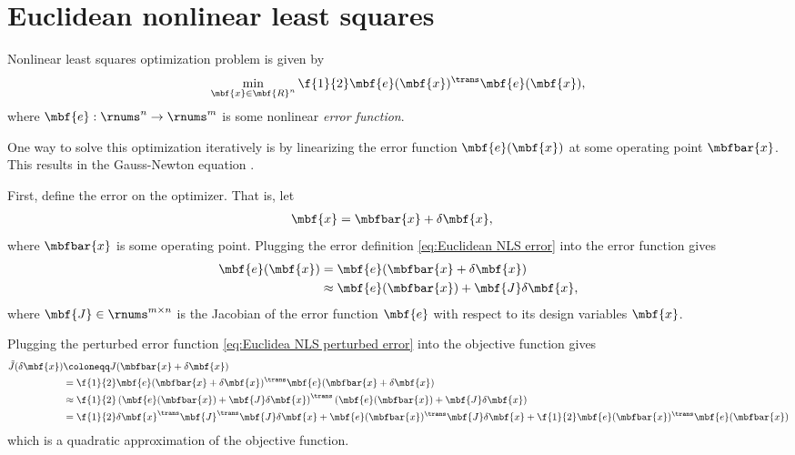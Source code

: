 \documentclass[ nobib, nofonts, notoc]{tufte-handout}
\begin{document}
    \section{Euclidean nonlinear least squares}
    Nonlinear least squares optimization problem is given by
    \begin{align}
        \min_{\mbf{x}\in\mbf{R}^{n}} \f{1}{2}\mbf{e}(\mbf{x})^{\trans}\mbf{e}(\mbf{x}),
    \end{align}
    where $\mbf{e} : \rnums^{n} \to \rnums^{m}$ is some nonlinear \emph{error function}.

    One way to solve this optimization iteratively is by linearizing the error function $\mbf{e}(\mbf{x})$ at some operating point $\mbfbar{x}$. This results in the Gauss-Newton equation \cite{Barfoot_State_2017a,Dellaert_Factor_2017}.

    First, define the error on the optimizer. That is, let
    \begin{align}
        \label{eq:Euclidean NLS error}
        \mbf{x} &= \mbfbar{x} + \delta\mbf{x},
    \end{align}
    where $\mbfbar{x}$ is some operating point. Plugging the error definition \eqref{eq:Euclidean NLS error} into the error function gives
    \begin{align}
        \mbf{e}(\mbf{x}) &= \mbf{e}(\mbfbar{x} +\delta\mbf{x})\\
        \label{eq:Euclidea NLS perturbed error}
        &\approx \mbf{e}(\mbfbar{x}) + \mbf{J}\delta\mbf{x},
    \end{align}
    where $\mbf{J}\in\rnums^{m\times n}$ is the Jacobian of the error function $\mbf{e}$ with respect to its design variables $\mbf{x}$.

    Plugging the perturbed error function \eqref{eq:Euclidea NLS perturbed error} into the objective function gives 
    \begin{align}
        \tilde{J}(\delta\mbf{x}) &\coloneqq J(\mbfbar{x} + \delta\mbf{x})\\
        &= \f{1}{2}\mbf{e}(\mbfbar{x} + \delta\mbf{x})^{\trans}\mbf{e}(\mbfbar{x} + \delta\mbf{x})\\
        &\approx
        \f{1}{2}\left( \mbf{e}(\mbfbar{x}) + \mbf{J}\delta\mbf{x} \right)^{\trans} \left( \mbf{e}(\mbfbar{x}) + \mbf{J}\delta\mbf{x} \right)\\
        &= \f{1}{2}\delta\mbf{x}^{\trans}\mbf{J}^{\trans}\mbf{J}\delta\mbf{x} + \mbf{e}(\mbfbar{x})^{\trans}\mbf{J}\delta\mbf{x} + \f{1}{2}\mbf{e}(\mbfbar{x})^{\trans}\mbf{e}(\mbfbar{x})
    \end{align}
    which is a quadratic approximation of the objective function.
\end{document}
